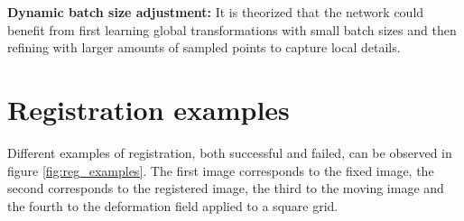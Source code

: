 \textbf{Dynamic batch size adjustment:} It is theorized that the network could benefit from first learning global transformations with small batch sizes and then refining with larger amounts of sampled points to capture local details.

\section{Registration examples}\label{sec:Exemplos de rexistro}

Different examples of registration, both successful and failed, can be observed in figure \ref{fig:reg_examples}.
The first image corresponds to the fixed image, the second corresponds to the registered image, the third to the moving image and the fourth to the deformation field applied to a square grid.

